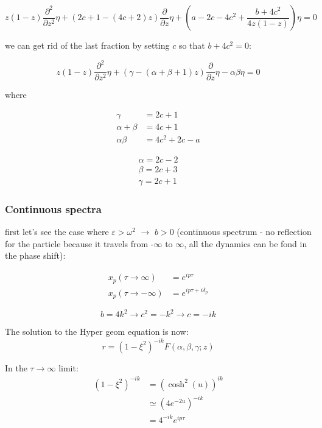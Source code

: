 \documentclass[12pt,a4paper]{article}
\numberwithin{equation}{section}
\begin{document}
\begin{equation}
z(1-z)\frac{\partial^2}{\partial z^2} \eta + (2c + 1 - (4c +2)z)\frac{\partial}{\partial z} \eta + \left(a-2c-4c^2 + \frac{b+4c^2}{4z(1-z)}\right) \eta = 0
\end{equation}

we can get rid of the last fraction by setting $c$ so that $b+4c^2 = 0$:

\begin{equation}
z(1-z)\frac{\partial^2}{\partial z^2} \eta + (\gamma - (\alpha + \beta + 1) z)\frac{\partial}{\partial z} \eta - \alpha\beta \eta = 0
\end{equation}

where

\begin{align}
\gamma &= 2c+1 \\
\alpha + \beta &= 4c + 1\\
\alpha\beta &= 4c^2 + 2c -a
\end{align}

\begin{align}
\alpha = 2c - 2 \\
\beta = 2c+3 \\
\gamma = 2c + 1
\end{align}

\subsubsection{Continuous spectra}
first let's see the case where $\varepsilon > \omega^2 $ $\rightarrow$ $b>0$ (continuous spectrum - no reflection for the particle because it travels from -$\infty$ to $\infty$, all the dynamics can be fond in the phase shift):

\begin{align}
x_p (\tau \rightarrow \infty) &= e^{ip\tau}\\
x_p (\tau \rightarrow -\infty) &= e^{ip\tau + i\delta_p}
\end{align}

\begin{equation}
b = 4k^2 \rightarrow c^2 = -k^2 \rightarrow c = -ik
\end{equation}

The solution to the Hyper geom equation is now:
\begin{equation}
r = (1-\xi^2)^{-ik} F ( \alpha,\beta,\gamma;z)
\end{equation}


In the $\tau \rightarrow \infty$ limit:
\begin{align}
(1-\xi^2)^{-ik} &= \left(  \cosh^2 (u) \right)^{ik}\\
&\simeq \left( 4 e^{-2u}  \right)^{-ik} \\
&= 4^{-ik} e^{ip\tau}
\end{align}
\end{document}
